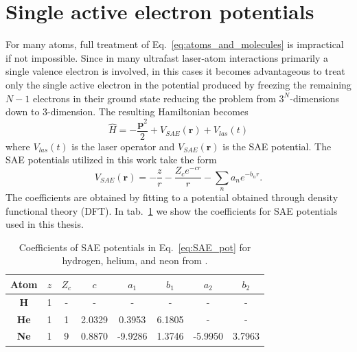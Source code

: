 \section{Single active electron potentials}
\label{sec:SAE}
For many atoms, full treatment of Eq.~\ref{eq:atoms_and_molecules} is impractical if not impossible. Since in many ultrafast laser-atom interactions primarily a single valence electron is involved, in this cases it becomes advantageous to treat only the single active electron in the potential produced by freezing the remaining $N-1$ electrons in their ground state reducing the problem from $3^N$-dimensions down to 3-dimension. The resulting Hamiltonian becomes
\begin{equation}
  \label{eq:SAE_TDSE}
  \hat{H} = -\frac{\mathbf{p}^2}{2} + V_{SAE}(\mathbf{r}) + V_{las}(t)
\end{equation}
where $V_{las}(t)$ is the laser operator and $V_{SAE}(\mathbf{r})$ is the SAE potential. The SAE potentials utilized in this work take the form \cite{reiff_single-active_2020} 
\begin{equation}
  \label{eq:SAE_pot}
  V_{SAE}(\mathbf{r}) = - \frac{z}{r} - \frac{Z_c e^{-c r}}{r} - \sum_n a_n e^{-b_n r}.
\end{equation}
The coefficients are obtained by fitting to a potential obtained through density functional theory (DFT).  In tab.~\ref{tab:SAE} we show the coefficients for SAE potentials used in this thesis.
\begin{table}
\begin{center}
 \begin{tabular}{|c|c|c|c|c|c|c|c|} 
 \hline
 \textbf{Atom} & $z$ & $Z_c$ & $c$ & $a_1$ & $b_1$ & $a_2$ & $b_2$ \\
 \hline
 \textbf{H} & 1 & - & - &  - & - &  - & - \\ 
 \hline
 \textbf{He} & 1 & 1 & 2.0329 &  0.3953 & 6.1805 &  - & - \\ 
 \hline
 \textbf{Ne} & 1 & 9 & 0.8870 &  -9.9286 & 1.3746 &  -5.9950 & 3.7963 \\ 
 \hline
\end{tabular}
\end{center}
 \caption{Coefficients of SAE potentials in Eq.~\ref{eq:SAE_pot} for hydrogen, helium, and neon from \cite{reiff_single-active_2020}.}
 \label{tab:SAE}
\end{table}


